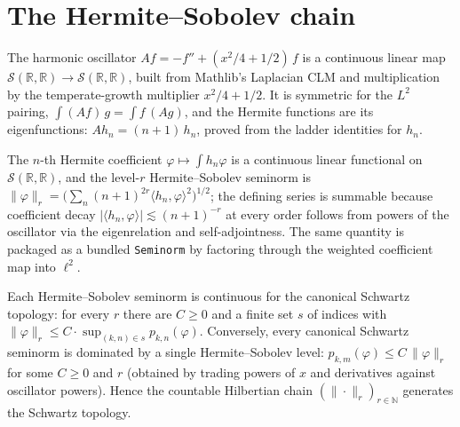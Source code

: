 \section{The Hermite--Sobolev chain}

\begin{definition}\label{def:mit-oscillator}
  \leanok
  The harmonic oscillator $A f = -f'' + (x^2/4 + 1/2)\,f$ is a continuous linear map
  $\mathcal{S}(\mathbb{R},\mathbb{R}) \to \mathcal{S}(\mathbb{R},\mathbb{R})$, built from Mathlib's
  Laplacian CLM and multiplication by the temperate-growth multiplier $x^2/4 + 1/2$.  It is
  symmetric for the $L^2$ pairing, $\int (Af)\,g = \int f\,(Ag)$, and the Hermite functions are its
  eigenfunctions: $A h_n = (n+1)\, h_n$, proved from the ladder identities for $h_n$.
\end{definition}

\begin{definition}\label{def:mit-sobolev-seminorm}
  \leanok
  The $n$-th Hermite coefficient $\varphi \mapsto \int h_n \varphi$ is a continuous linear
  functional on $\mathcal{S}(\mathbb{R},\mathbb{R})$, and the level-$r$ Hermite--Sobolev seminorm is
  $\|\varphi\|_r = \bigl(\sum_n (n+1)^{2r} \langle h_n, \varphi\rangle^2\bigr)^{1/2}$; the defining
  series is summable because coefficient decay $|\langle h_n, \varphi\rangle| \lesssim (n+1)^{-r}$
  at every order follows from powers of the oscillator via the eigenrelation and self-adjointness.
  The same quantity is packaged as a bundled \texttt{Seminorm} by factoring through the weighted
  coefficient map into $\ell^2$.
\end{definition}

\begin{theorem}\label{thm:mit-sobolev-equiv}
  \leanok
  Each Hermite--Sobolev seminorm is continuous for the canonical Schwartz topology: for every $r$
  there are $C \ge 0$ and a finite set $s$ of indices with
  $\|\varphi\|_r \le C \cdot \sup_{(k,n) \in s} p_{k,n}(\varphi)$.  Conversely, every canonical
  Schwartz seminorm is dominated by a single Hermite--Sobolev level:
  $p_{k,m}(\varphi) \le C\, \|\varphi\|_r$ for some $C \ge 0$ and $r$ (obtained by trading powers of
  $x$ and derivatives against oscillator powers).  Hence the countable Hilbertian chain
  $(\|\cdot\|_r)_{r \in \mathbb{N}}$ generates the Schwartz topology.
\end{theorem}

